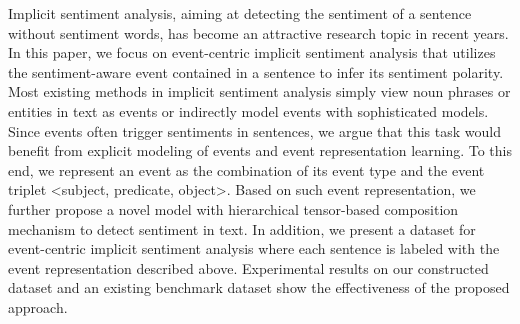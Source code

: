 Implicit sentiment analysis, aiming at detecting the sentiment of a sentence without sentiment words, has become an attractive research topic in recent years. In this paper, we focus on event-centric implicit sentiment analysis that utilizes the sentiment-aware event contained in a sentence to infer its sentiment polarity. Most existing methods in implicit sentiment analysis simply view noun phrases or entities in text as events or indirectly model events with sophisticated models. Since events often trigger sentiments in sentences, we argue that this task would benefit from explicit modeling of events and event representation learning. To this end, we represent an event as the combination of its event type and the event triplet <subject, predicate, object>. Based on such event representation, we further propose a novel model with hierarchical tensor-based composition mechanism to detect sentiment in text. In addition, we present a dataset for event-centric implicit sentiment analysis where each sentence is labeled with the event representation described above. Experimental results on our constructed dataset and an existing benchmark dataset show the effectiveness of the proposed approach.
